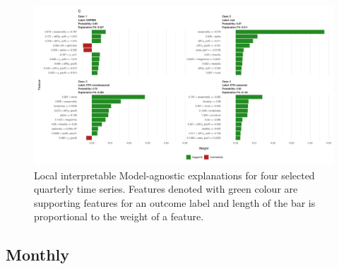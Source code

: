 \documentclass[11pt,a4paper,]{article}
\theoremstyle{definition}
\theoremstyle{definition}
\theoremstyle{definition}
\theoremstyle{remark}
\begin{document}
\begin{figure}[h]

{\centering \includegraphics{figures/quarterlylime2-1} 

}

\caption{Local interpretable Model-agnostic explanations for four selected quarterly time series. Features denoted with green colour are supporting features for an outcome label and length of the bar is proportional to the weight of a feature.}\label{fig:quarterlylime2}
\end{figure}

\subsection{Monthly}\label{monthly}
\end{document}

